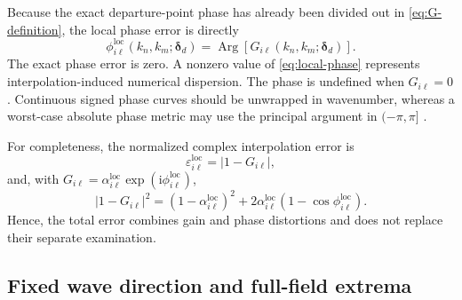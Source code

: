 \documentclass[11pt]{article}
\numberwithin{equation}{section}
\DeclareMathOperator{\Arg}{Arg}
\newcommand{\ii}{\mathrm{i}}
\begin{document}
Because the exact departure-point phase has already been divided out in \cref{eq:G-definition}, the local phase error is directly
\begin{equation}
    \boxed{
    \phi_{i\ell}^{\mathrm{loc}}
    \!\left(k_n,k_m;\bm{\delta}_d\right)
    =
    \Arg\!\left[
        G_{i\ell}\!\left(k_n,k_m;\bm{\delta}_d\right)
    \right].
    }
    \label{eq:local-phase}
\end{equation}
The exact phase error is zero. A nonzero value of \cref{eq:local-phase} represents interpolation-induced numerical dispersion. The phase is undefined when $G_{i\ell}=0$. Continuous signed phase curves should be unwrapped in wavenumber, whereas a worst-case absolute phase metric may use the principal argument in $(-\pi,\pi]$ \cite{Desvigne2010}.

For completeness, the normalized complex interpolation error is
\begin{equation}
    \varepsilon_{i\ell}^{\mathrm{loc}}
    =
    \left|1-G_{i\ell}\right|,
    \label{eq:total-complex-error}
\end{equation}
and, with $G_{i\ell}=\alpha_{i\ell}^{\mathrm{loc}}\exp(\ii\phi_{i\ell}^{\mathrm{loc}})$,
\begin{equation}
    \left|1-G_{i\ell}\right|^2
    =
    \left(1-\alpha_{i\ell}^{\mathrm{loc}}\right)^2
    +
    2\alpha_{i\ell}^{\mathrm{loc}}
    \left(1-\cos\phi_{i\ell}^{\mathrm{loc}}\right).
    \label{eq:complex-error-decomposition}
\end{equation}
Hence, the total error combines gain and phase distortions and does not replace their separate examination.

\subsection{Fixed wave direction and full-field extrema}
\end{document}
